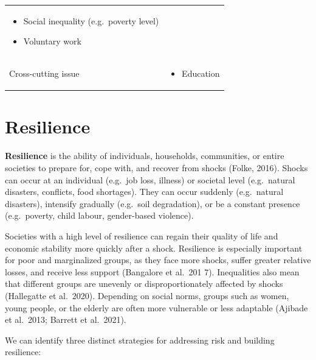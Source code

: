 \documentclass[
  a4paper,
  openany]{book}
\providecommand{\tightlist}{%
  \setlength{\itemsep}{0pt}\setlength{\parskip}{0pt}}
\begin{document}
\begin{longtable}[]{@{}
  >{\raggedright\arraybackslash}p{}
  >{\raggedright\arraybackslash}p{}@{}}
\begin{minipage}[t]{\linewidth}
\begin{itemize}
  with disabilities)
\item
  Social inequality (e.g.~poverty level)
\item
  Voluntary work
\end{itemize}
\end{minipage} \\
Cross-cutting issue & \begin{minipage}[t]{\linewidth}\raggedright
\begin{itemize}
\tightlist
\item
  Education
\end{itemize}
\end{minipage} \\
\end{longtable}

\section{Resilience}\label{resilience}

\textbf{Resilience} is the ability of individuals, households,
communities, or entire societies to prepare for, cope with, and recover
from shocks (Folke, 2016). Shocks can occur at an individual (e.g.~job
loss, illness) or societal level (e.g.~natural disasters, conflicts,
food shortages). They can occur suddenly (e.g.~natural disasters),
intensify gradually (e.g.~soil degradation), or be a constant presence
(e.g.~poverty, child labour, gender-based violence).

Societies with a high level of resilience can regain their quality of
life and economic stability more quickly after a shock. Resilience is
especially important for poor and marginalized groups, as they face more
shocks, suffer greater relative losses, and receive less support
(Bangalore et al.~201 7). Inequalities also mean that different groups
are unevenly or disproportionately affected by shocks (Hallegatte et
al.~2020). Depending on social norms, groups such as women, young
people, or the elderly are often more vulnerable or less adaptable
(Ajibade et al.~2013; Barrett et al.~2021).

We can identify three distinct strategies for addressing risk and
building resilience:
\end{document}
